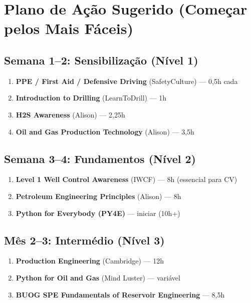 \documentclass[11pt,a4paper]{article}
\begin{document}
\clearpage
\section*{Plano de Ação Sugerido (Começar pelos Mais Fáceis)}

\subsection*{Semana 1--2: Sensibilização (Nível 1)}
\begin{enumerate}[leftmargin=*]
    \item \textbf{PPE / First Aid / Defensive Driving} (SafetyCulture) --- 0,5h cada
    \item \textbf{Introduction to Drilling} (LearnToDrill) --- 1h
    \item \textbf{H2S Awareness} (Alison) --- 2,25h
    \item \textbf{Oil and Gas Production Technology} (Alison) --- 3,5h
\end{enumerate}

\subsection*{Semana 3--4: Fundamentos (Nível 2)}
\begin{enumerate}[leftmargin=*]
    \item \textbf{Level 1 Well Control Awareness} (IWCF) --- 8h (essencial para CV)
    \item \textbf{Petroleum Engineering Principles} (Alison) --- 8h
    \item \textbf{Python for Everybody (PY4E)} --- iniciar (10h+)
\end{enumerate}

\subsection*{Mês 2--3: Intermédio (Nível 3)}
\begin{enumerate}[leftmargin=*]
    \item \textbf{Production Engineering} (Cambridge) --- 12h
    \item \textbf{Python for Oil and Gas} (Mind Luster) --- variável
    \item \textbf{BUOG SPE Fundamentals of Reservoir Engineering} --- 8,5h
\end{enumerate}
\end{document}
